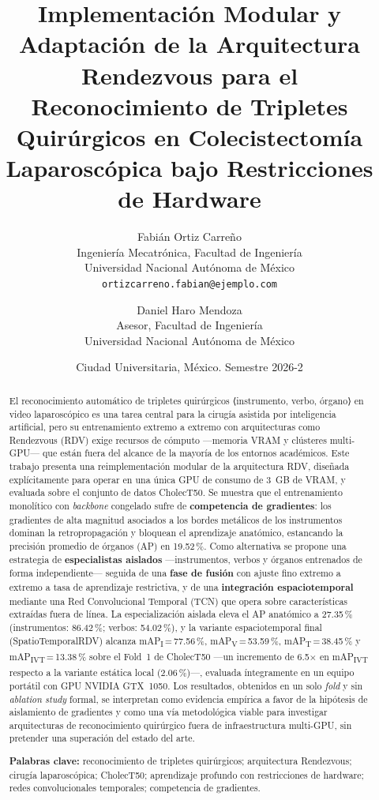 \documentclass[11pt]{article}
\title{\LARGE\bfseries Implementación Modular y Adaptación de la Arquitectura Rendezvous para el Reconocimiento de Tripletes Quirúrgicos en Colecistectomía Laparoscópica bajo Restricciones de Hardware}
\author{
Fabián Ortiz Carreño \\
{\small Ingeniería Mecatrónica, Facultad de Ingeniería} \\
{\small Universidad Nacional Autónoma de México} \\
{\small\texttt{ortizcarreno.fabian@ejemplo.com}}
\and
Daniel Haro Mendoza \\
{\small Asesor, Facultad de Ingeniería} \\
{\small Universidad Nacional Autónoma de México}
}
\date{Ciudad Universitaria, México. Semestre 2026-2}
\begin{document}
\maketitle
\thispagestyle{fancy}

\begin{abstract}
El reconocimiento automático de tripletes quirúrgicos ⟨instrumento, verbo, órgano⟩ en video laparoscópico es una tarea central para la cirugía asistida por inteligencia artificial, pero su entrenamiento extremo a extremo con arquitecturas como Rendezvous (RDV) exige recursos de cómputo —memoria VRAM y clústeres multi-GPU— que están fuera del alcance de la mayoría de los entornos académicos. Este trabajo presenta una reimplementación modular de la arquitectura RDV, diseñada explícitamente para operar en una única GPU de consumo de 3~GB de VRAM, y evaluada sobre el conjunto de datos CholecT50. Se muestra que el entrenamiento monolítico con \emph{backbone} congelado sufre de \textbf{competencia de gradientes}: los gradientes de alta magnitud asociados a los bordes metálicos de los instrumentos dominan la retropropagación y bloquean el aprendizaje anatómico, estancando la precisión promedio de órganos (AP) en 19.52\,\%. Como alternativa se propone una estrategia de \textbf{especialistas aislados} —instrumentos, verbos y órganos entrenados de forma independiente— seguida de una \textbf{fase de fusión} con ajuste fino extremo a extremo a tasa de aprendizaje restrictiva, y de una \textbf{integración espaciotemporal} mediante una Red Convolucional Temporal (TCN) que opera sobre características extraídas fuera de línea. La especialización aislada eleva el AP anatómico a 27.35\,\% (instrumentos: 86.42\,\%; verbos: 54.02\,\%), y la variante espaciotemporal final (SpatioTemporalRDV) alcanza mAP\textsubscript{I}\,=\,77.56\,\%, mAP\textsubscript{V}\,=\,53.59\,\%, mAP\textsubscript{T}\,=\,38.45\,\% y mAP\textsubscript{IVT}\,=\,13.38\,\% sobre el Fold~1 de CholecT50 —un incremento de 6.5$\times$ en mAP\textsubscript{IVT} respecto a la variante estática local (2.06\,\%)—, evaluada íntegramente en un equipo portátil con GPU NVIDIA GTX~1050. Los resultados, obtenidos en un solo \emph{fold} y sin \emph{ablation study} formal, se interpretan como evidencia empírica a favor de la hipótesis de aislamiento de gradientes y como una vía metodológica viable para investigar arquitecturas de reconocimiento quirúrgico fuera de infraestructura multi-GPU, sin pretender una superación del estado del arte.

\smallskip
\noindent\textbf{Palabras clave:} reconocimiento de tripletes quirúrgicos; arquitectura Rendezvous; cirugía laparoscópica; CholecT50; aprendizaje profundo con restricciones de hardware; redes convolucionales temporales; competencia de gradientes.
\end{abstract}
\end{document}

